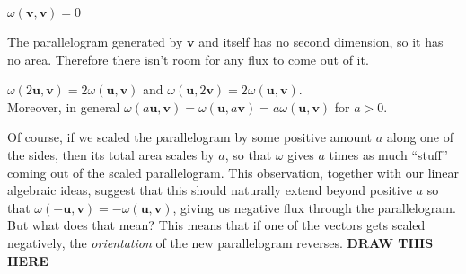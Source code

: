	\begin{obs}
		$\omega(\mathbf v, \mathbf v) = 0$
	\end{obs}
	The parallelogram generated by $\mathbf v$ and itself has no second dimension, so it has no area. Therefore there isn't room for any flux to come out of it.
	\begin{obs}
		$\omega(2\mathbf u, \mathbf v) = 2 \omega(\mathbf u, \mathbf v)$ and $\omega(\mathbf u,2 \mathbf v) = 2 \omega(\mathbf u, \mathbf v)$.\\
		Moreover, in general $\omega(a \mathbf u, \mathbf v) = \omega(\mathbf u,a \mathbf v)= a \omega(\mathbf u, \mathbf v)$ for $a>0$.
	\end{obs}
	Of course, if we scaled the parallelogram by some positive amount $a$ along one of the sides, then its total area scales by $a$, so that $\omega$ gives $a$ times as much ``stuff'' coming out of the scaled parallelogram. This observation, together with our linear algebraic ideas, suggest that this should naturally extend beyond positive $a$ so that $\omega(-\mathbf u,\mathbf v) = -\omega(\mathbf u, \mathbf v)$, giving us negative flux through the parallelogram. But what does that mean? This means that if one of the vectors gets scaled negatively, the \emph{orientation} of the new parallelogram reverses. 
	\textbf{DRAW THIS HERE}
	
